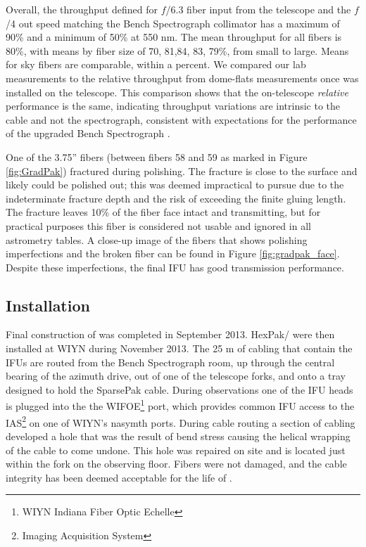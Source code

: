 Overall, the throughput defined for $f$/6.3 fiber input from the
telescope and the $f$/4 out speed matching the Bench Spectrograph
collimator has a maximum of 90\% and a minimum of 50\% at 550 nm. The
mean throughput for all fibers is 80\%, with means by fiber size of
70, 81,84, 83, 79\%, from small to large. Means for sky fibers are
comparable, within a percent. We compared our lab measurements to the
relative throughput from dome-flats measurements once \GP was
installed on the telescope. This comparison shows that the
on-telescope {\it relative} performance is the same, indicating
throughput variations are intrinsic to the cable and not the
spectrograph, consistent with expectations for the performance of the
upgraded Bench Spectrograph \citep{Bershady08,Knezek10}.

One of the 3.75'' fibers (between fibers 58 and 59 as marked in Figure
\ref{fig:GradPak}) fractured during polishing. The fracture is close
to the surface and likely could be polished out; this was deemed
impractical to pursue due to the indeterminate fracture depth and the
risk of exceeding the finite gluing length. The fracture leaves 10\%
of the fiber face intact and transmitting, but for practical purposes
this fiber is considered not usable and ignored in all astrometry
tables.  A close-up image of the \GP fibers that shows polishing
imperfections and the broken fiber can be found in Figure
\ref{fig:gradpak_face}.  Despite these imperfections, the final IFU
has good transmission performance.

\subsection{Installation}
\label{891_1:sec:install}

Final construction of \GP was completed in September 2013.  HexPak/\GP
were then installed at WIYN during November 2013. The 25 m of cabling
that contain the IFUs are routed from the Bench Spectrograph room, up
through the central bearing of the azimuth drive, out of one of the
telescope forks, and onto a tray designed to hold the SparsePak
cable. During observations one of the IFU heads is plugged into the
the WIFOE\footnote{WIYN Indiana Fiber Optic Echelle} port, which
provides common IFU access to the IAS\footnote{Imaging Acquisition
  System} on one of WIYN's nasymth ports. During cable routing a
section of cabling developed a hole that was the result of bend stress
causing the helical wrapping of the cable to come undone. This hole
was repaired on site and is located just within the fork on the
observing floor. Fibers were not damaged, and the cable integrity has
been deemed acceptable for the life of \GP.

